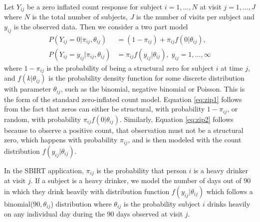 \documentclass[12pt]{article}
\begin{document}
Let $Y_{ij}$ be a zero inflated count response for subject $i=1,\dots,N$ at visit $j=1, \dots, J$ where $N$ is the total number of subjects, $J$ is the number of visits per subject and $y_{ij}$ is the observed data. Then we consider a two part model
\begin{align}
	P(Y_{ij} = 0 | \pi_{ij}, \theta_{ij}) &= (1 - \pi_{ij}) + \pi_{ij} f(0 | \theta_{ij}), \label{eq:zip1} \\
	P(Y_{ij} = y_{ij} | \pi_{ij}, \theta_{ij}) &= \pi_{ij} f(y_{ij}| \theta_{ij}), \; y_{ij}=1, \dots, \infty \label{eq:zip2}
\end{align}
where $1-\pi_{ij}$ is the probability of being a structural zero for subject $i$ at time $j$, and $f(k| \theta_{ij})$ is the probability density function for some discrete distribution with parameter $\theta_{ij}$, such as the binomial, negative binomial or Poisson. This is the form of the standard zero-inflated count model. Equation \eqref{eq:zip1} follows from the fact that zeros can either be structural, with probability $1-\pi_{ij}$, or random, with probability $\pi_{ij} f(0 | \theta_{ij})$. Similarly, Equation \eqref{eq:zip2} follows because to observe a positive count, that observation must not be a structural zero, which happens with probability $\pi_{ij}$, and is then modeled with the count distribution $f(y_{ij}| \theta_{ij})$.

In the SBIRT application, $\pi_{ij}$ is the probability that person $i$ is a heavy drinker at visit $j$. If a subject is a heavy drinker, we model the number of days out of 90 in which they drink heavily with distribution function $f(y_{ij}| \theta_{ij})$ which follows a binomial($90, \theta_{ij}$) distribution where $\theta_{ij}$ is the probability subject $i$ drinks heavily on any individual day during the 90 days observed at visit $j$. 
\end{document}
